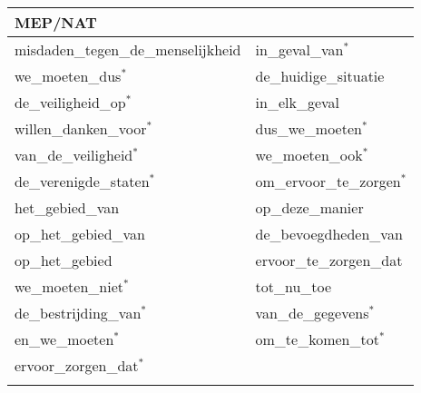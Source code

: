 \documentclass[output=paper]{langscibook}
\begin{document}
\label{ap:defrancq:1}

\begin{table}
\begin{tabularx}{\textwidth}{ll}

\lsptoprule
{\bfseries MEP/NAT} & \\
\midrule
misdaden\_tegen\_de\_menselijkheid & in\_geval\_van$^{*}$\\
we\_moeten\_dus$^{*}$ & de\_huidige\_situatie\\
de\_veiligheid\_op$^{*}$ & in\_elk\_geval\\
willen\_danken\_voor$^{*}$ & dus\_we\_moeten$^{*}$\\
van\_de\_veiligheid$^{*}$ & we\_moeten\_ook$^{*}$\\
de\_verenigde\_staten$^{*}$ & om\_ervoor\_te\_zorgen$^{*}$\\
het\_gebied\_van & op\_deze\_manier\\
op\_het\_gebied\_van & de\_bevoegdheden\_van\\
op\_het\_gebied & ervoor\_te\_zorgen\_dat\\
we\_moeten\_niet$^{*}$ & tot\_nu\_toe\\
de\_bestrijding\_van$^{*}$ & van\_de\_gegevens$^{*}$\\
en\_we\_moeten$^{*}$ & om\_te\_komen\_tot$^{*}$\\
ervoor\_zorgen\_dat$^{*}$ & \\
\lspbottomrule
\end{tabularx}
\end{table}

\newpage
\largerpage[3]
\label{ap:defrancq:2}\vspace*{-5mm}
\end{document}
